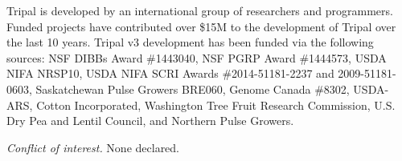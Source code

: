 Tripal is developed by an international group of researchers and programmers. Funded projects have contributed over \$15M to the development of Tripal over the last 10 years. Tripal v3 development has been funded via the following sources: NSF DIBBs Award \#1443040, NSF PGRP Award \#1444573, USDA NIFA NRSP10, USDA NIFA SCRI Awards \#2014-51181-2237 and 2009-51181-0603, Saskatchewan Pulse Growers BRE060, Genome Canada \#8302, USDA-ARS, Cotton Incorporated, Washington Tree Fruit Research Commission, U.S. Dry Pea and Lentil Council, and Northern Pulse Growers.

\textit{Conflict of interest.} None declared.

\footnotesize


\normalsize
